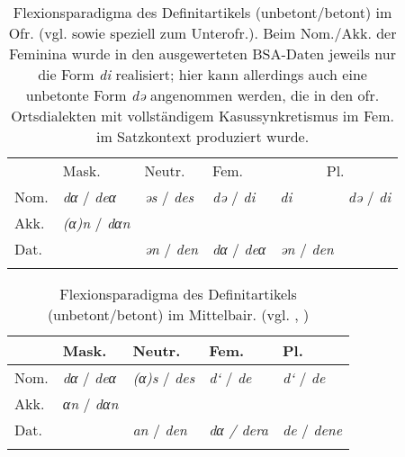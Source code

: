 \begin{table}[p]
\begin{tabular}{llllll}
\lsptoprule
& {Mask.} & {Neutr.} & {Fem.} & \multicolumn{2}{c}{{Pl.}}\\\cmidrule(lr){2-4}\cmidrule(lr){5-6}
{Nom.} & \cellcolor{lsLightGray}\textit{dα} / \textit{deα} & \cellcolor{lsLightGray}\textit{əs} / \textit{des} & \cellcolor{lsLightGray}\textit{də} / \textit{di} & \cellcolor{lsLightGray}\textit{di} & \cellcolor{lsLightGray}\textit{də} / \textit{di}\\
{Akk.} & \cellcolor{lsLightGray}\textit{(α)n} / \textit{dαn} & \cellcolor{lsLightGray} & \cellcolor{lsLightGray} & \cellcolor{lsLightGray} & \cellcolor{lsLightGray}\\
{Dat.} & \cellcolor{lsLightGray} & \textit{ən} / \textit{den} & \cellcolor{lsLightGray}\textit{dα} / \textit{deα} & \textit{ən} / \textit{den} & \cellcolor{lsLightGray}\\
\lspbottomrule
\end{tabular}
\caption{Flexionsparadigma des Definitartikels (unbetont\slash betont) im Ofr. (vgl. \citealt[403]{Rowley1990a} sowie \citealt[189]{SUF3} speziell zum Unterofr.). Beim Nom.\slash Akk. der Feminina wurde in den ausgewerteten BSA-Daten jeweils nur die Form \textit{di} realisiert; hier kann allerdings auch eine unbetonte Form \textit{də} angenommen werden, die in den ofr. Ortsdialekten mit vollständigem Kasussynkretismus im Fem. im Satzkontext produziert wurde.\label{tab:41}}
\end{table}

\begin{table}[p]
\begin{tabular}{lllll}
\lsptoprule
& {Mask.} & {Neutr.} & {Fem.} & {Pl.}\\\midrule
{Nom.} & \cellcolor{lsLightGray}\textit{dα} / \textit{deα} & \cellcolor{lsLightGray}\textit{(α)s} / \textit{des} & \cellcolor{lsLightGray}\textit{d‘} / \textit{de} & \cellcolor{lsLightGray}\textit{d‘} / \textit{de}\\
{Akk.} & \cellcolor{lsLightGray}\textit{αn} / \textit{dαn} & \cellcolor{lsLightGray} & \cellcolor{lsLightGray} & \cellcolor{lsLightGray}\\
{Dat.} & \cellcolor{lsLightGray} & \textit{an} / \textit{den} & \cellcolor{lsLightGray}\textit{dα / dera} & \textit{de} / \textit{dene}\\
\lspbottomrule
\end{tabular}
\caption{Flexionsparadigma des Definitartikels (unbetont\slash betont) im Mittelbair. (vgl. \citealt[316]{Eroms1989}, \citealt[237]{Scheutz1988})}
\label{tab:42}
\end{table}

